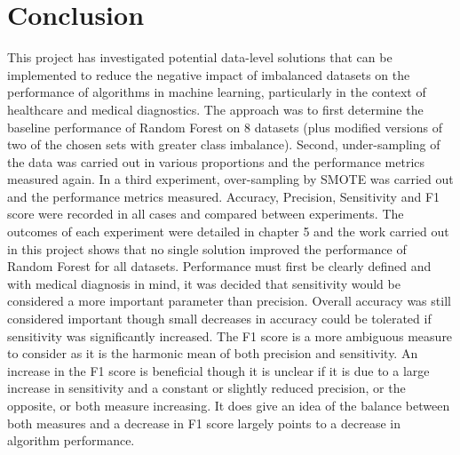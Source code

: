 \chapter{Conclusion}\label{ch:Conclusion}
This project has investigated potential data-level solutions that can be implemented to reduce the negative impact of imbalanced datasets on the performance of algorithms in machine learning, particularly in the context of healthcare and medical diagnostics.\newline
The approach was to first determine the baseline performance of Random Forest on 8 datasets (plus modified versions of two of the chosen sets with greater class imbalance). Second, under-sampling of the data was carried out in various proportions and the performance metrics measured again. In a third experiment, over-sampling by SMOTE was carried out and the performance metrics measured. Accuracy, Precision, Sensitivity and F1 score were recorded in all cases and compared between experiments.\newline
The outcomes of each experiment were detailed in chapter 5 and the work carried out in this project shows that no single solution improved the performance of Random Forest for all datasets.\newline
Performance must first be clearly defined and with medical diagnosis in mind, it was decided that sensitivity would be considered a more important parameter than precision. Overall accuracy was still considered important though small decreases in accuracy could be tolerated if sensitivity was significantly increased. The F1 score is a more ambiguous measure to consider as it is the harmonic mean of both precision and sensitivity. An increase in the F1 score is beneficial though it is unclear if it is due to a large increase in sensitivity and a constant or slightly reduced precision, or the opposite, or both measure increasing. It does give an idea of the balance between both measures and a decrease in F1 score largely points to a decrease in algorithm performance.\newline


